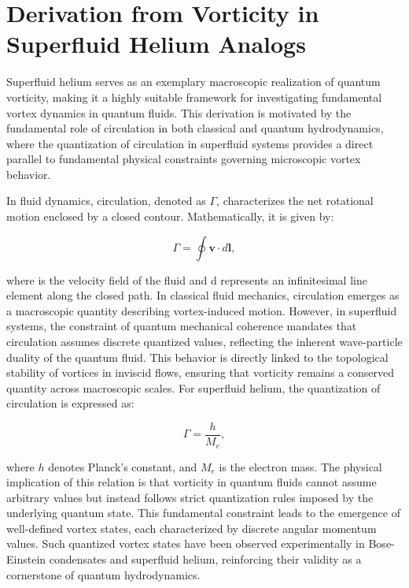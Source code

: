 \section*{Derivation from Vorticity in Superfluid Helium Analogs}

Superfluid helium serves as an exemplary macroscopic realization of quantum vorticity, making it a highly suitable framework for investigating fundamental vortex dynamics in quantum fluids. This derivation is motivated by the fundamental role of circulation in both classical and quantum hydrodynamics, where the quantization of circulation in superfluid systems provides a direct parallel to fundamental physical constraints governing microscopic vortex behavior.


In fluid dynamics, circulation, denoted as $\Gamma$, characterizes the net rotational motion enclosed by a closed contour. Mathematically, it is given by:

\begin{equation*}
\Gamma = \oint \mathbf{v} \cdot d\mathbf{l},
\label{eq:circulation_definition}
\end{equation*}

where  is the velocity field of the fluid and d represents an infinitesimal line element along the closed path. In classical fluid mechanics, circulation emerges as a macroscopic quantity describing vortex-induced motion. However, in superfluid systems, the constraint of quantum mechanical coherence mandates that circulation assumes discrete quantized values, reflecting the inherent wave-particle duality of the quantum fluid. This behavior is directly linked to the topological stability of vortices in inviscid flows, ensuring that vorticity remains a conserved quantity across macroscopic scales. For superfluid helium, the quantization of circulation is expressed as:

\begin{equation*}
\Gamma = \frac{h}{M_e},
\label{eq:circulation}
\end{equation*}

where $h$ denotes Planck's constant, and  $ M_e $ is the electron mass. The physical implication of this relation is that vorticity in quantum fluids cannot assume arbitrary values but instead follows strict quantization rules imposed by the underlying quantum state. This fundamental constraint leads to the emergence of well-defined vortex states, each characterized by discrete angular momentum values. Such quantized vortex states have been observed experimentally in Bose-Einstein condensates and superfluid helium, reinforcing their validity as a cornerstone of quantum hydrodynamics.


